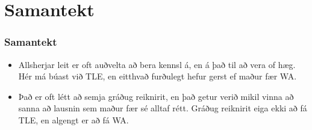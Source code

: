 \documentclass{beamer}
\begin{document}
\section{Samantekt}
\begin{frame}
\frametitle{Samantekt}
\begin{itemize}
	\item<1-> Allsherjar leit er oft auðvelta að bera kennsl á, en á það til að vera of hæg. 
		Hér má búast við TLE, en eitthvað furðulegt hefur gerst ef maður fær WA.
	\item<2-> Það er oft létt að semja gráðug reiknirit, en það getur verið mikil vinna að sanna að lausnin sem maður fær sé alltaf rétt.
		Gráðug reiknirit eiga ekki að fá TLE, en algengt er að fá WA.
\end{itemize}
\end{frame}
\end{document}
